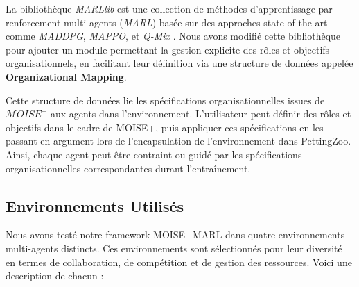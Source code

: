 \documentclass[sigconf,anonymous]{aamas}
\begin{document}
La bibliothèque \textit{MARLlib} est une collection de méthodes d'apprentissage par renforcement multi-agents (\textit{MARL}) basée sur des approches state-of-the-art comme \textit{MADDPG}, \textit{MAPPO}, et \textit{Q-Mix} \cite{hu2021marlib}. Nous avons modifié cette bibliothèque pour ajouter un module permettant la gestion explicite des rôles et objectifs organisationnels, en facilitant leur définition via une structure de données appelée \textbf{Organizational Mapping}.

Cette structure de données lie les spécifications organisationnelles issues de $\mathcal{M}OISE^+$ aux agents dans l'environnement. L'utilisateur peut définir des rôles et objectifs dans le cadre de MOISE+, puis appliquer ces spécifications en les passant en argument lors de l'encapsulation de l'environnement dans PettingZoo. Ainsi, chaque agent peut être contraint ou guidé par les spécifications organisationnelles correspondantes durant l'entraînement.

\subsection{Environnements Utilisés}

Nous avons testé notre framework MOISE+MARL dans quatre environnements multi-agents distincts. Ces environnements sont sélectionnés pour leur diversité en termes de collaboration, de compétition et de gestion des ressources. Voici une description de chacun :
\end{document}
